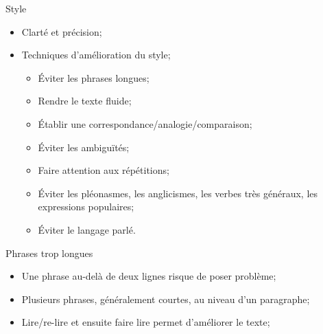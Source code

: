 \documentclass[french]{beamer}
\begin{document}
\begin{frame}{Style}
\begin{itemize}
	\item Clarté et précision;
	\item Techniques d'amélioration du style;
	\begin{itemize}
		\item Éviter les phrases longues;
		\item Rendre le texte fluide;
		\item Établir une correspondance/analogie/comparaison;
		\item Éviter les ambiguïtés;
		\item Faire attention aux répétitions;
		\item Éviter les pléonasmes, les anglicismes, les verbes très généraux, les expressions populaires;
		\item Éviter le langage parlé.
	\end{itemize}
\end{itemize}
\end{frame}

\begin{frame}{Phrases trop longues}
\begin{itemize}
	\item Une phrase au-delà de deux lignes risque de poser problème;
	\item Plusieurs phrases, généralement courtes, au niveau d'un paragraphe;
	\item Lire/re-lire et ensuite faire lire permet d'améliorer le texte;
\end{itemize}
\end{frame}
\end{document}
